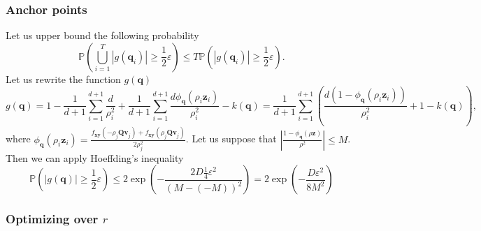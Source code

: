 \subsubsection{Anchor points}
Let us upper bound the following probability
\[
\mathbb{P}\left (\bigcup\limits_{i = 1}^T |g(\mathbf{q}_i)| \geq \frac12 \varepsilon \right) \leq
T \mathbb{P}\left ( |g(\mathbf{q}_i)| \geq \frac12 \varepsilon\right).
\]
Let us rewrite the function $g(\mathbf{q})$
\[
g(\mathbf{q}) = 1 - \frac{1}{d + 1}\sum_{i = 1}^{d + 1} \frac{d}{\rho_i^2} +
\frac{1}{d + 1} \sum_{i = 1}^{d + 1} \frac{d \phi_{\mathbf{q}}(\rho_i\mathbf{z}_i)}{\rho_i^2} - k(\mathbf{q}) = \frac{1}{d + 1}\sum_{i = 1}^{d + 1} \left (
\frac{d(1 - \phi_\mathbf{q}(\rho_i \mathbf{z}_i))}{\rho_i^2} + 1 - k(\mathbf{q})
\right ),
\]
where $\phi_{\mathbf{q}}(\rho_i \mathbf{z}_i) = \frac{f_{\mathbf{xy}}(-\rho_j \mathbf{Qv}_j) + f_{\mathbf{xy}}(\rho_j \mathbf{Qv}_j)}{2 \rho_j^2}$.
Let us suppose that $\left |\frac{1 - \phi_{\mathbf{q}}(\rho \mathbf{z})}{\rho^2} \right | \leq M$.
Then we can apply Hoeffding's inequality
\[
\mathbb{P}(|g(\mathbf{q})| \geq \frac12 \varepsilon) \leq
2 \exp \left (
-\frac{2D \frac14 \varepsilon^2}{(M - (-M))^2}
\right ) =
2 \exp \left (
-\frac{D\varepsilon^2}{8M^2}
\right )
\]


\subsubsection{Optimizing over $r$}

